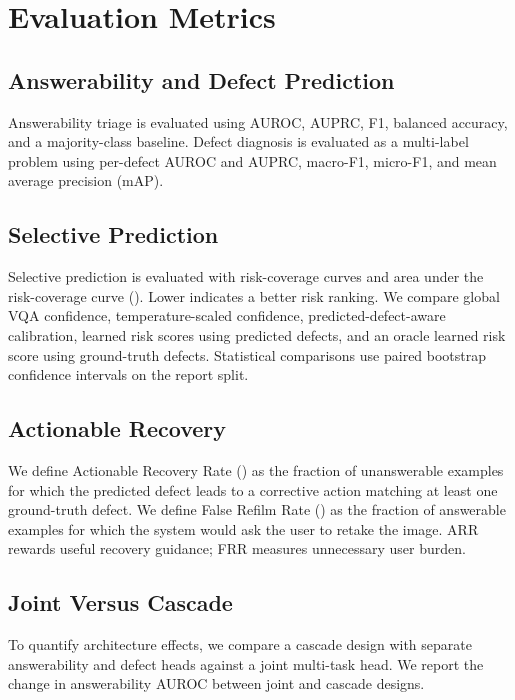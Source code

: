 \section{Evaluation Metrics}

\subsection{Answerability and Defect Prediction}
Answerability triage is evaluated using AUROC, AUPRC, F1, balanced accuracy, and a majority-class baseline. Defect diagnosis is evaluated as a multi-label problem using per-defect AUROC and AUPRC, macro-F1, micro-F1, and mean average precision (mAP).

\subsection{Selective Prediction}
Selective prediction is evaluated with risk-coverage curves and area under the risk-coverage curve (\aurc). Lower \aurc{} indicates a better risk ranking. We compare global VQA confidence, temperature-scaled confidence, predicted-defect-aware calibration, learned risk scores using predicted defects, and an oracle learned risk score using ground-truth defects. Statistical comparisons use paired bootstrap confidence intervals on the report split.

\subsection{Actionable Recovery}
We define Actionable Recovery Rate (\arr) as the fraction of unanswerable examples for which the predicted defect leads to a corrective action matching at least one ground-truth defect. We define False Refilm Rate (\frr) as the fraction of answerable examples for which the system would ask the user to retake the image. ARR rewards useful recovery guidance; FRR measures unnecessary user burden.

\subsection{Joint Versus Cascade}
To quantify architecture effects, we compare a cascade design with separate answerability and defect heads against a joint multi-task head. We report the change in answerability AUROC between joint and cascade designs.
